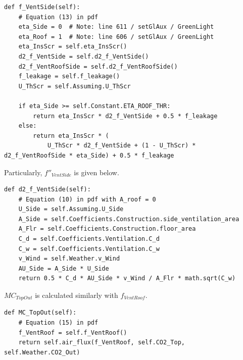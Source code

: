 \documentclass[a4paper]{article}
\begin{document}
\begin{mdframed}[leftline=false,rightline=false,backgroundcolor=magenta!10]
  \begin{verbatim}
def f_VentSide(self):
    # Equation (13) in pdf
    eta_Side = 0  # Note: line 611 / setGlAux / GreenLight
    eta_Roof = 1  # Note: line 606 / setGlAux / GreenLight
    eta_InsScr = self.eta_InsScr()
    d2_f_VentSide = self.d2_f_VentSide()
    d2_f_VentRoofSide = self.d2_f_VentRoofSide()
    f_leakage = self.f_leakage()
    U_ThScr = self.Assuming.U_ThScr

    if eta_Side >= self.Constant.ETA_ROOF_THR:
        return eta_InsScr * d2_f_VentSide + 0.5 * f_leakage
    else:
        return eta_InsScr * (
            U_ThScr * d2_f_VentSide + (1 - U_ThScr) * d2_f_VentRoofSide * eta_Side) + 0.5 * f_leakage
  \end{verbatim}
\end{mdframed}

Particularly, \(f''_{VentSide}\) is given below.
\begin{mdframed}[leftline=false,rightline=false,backgroundcolor=magenta!10]
  \begin{verbatim}
def d2_f_VentSide(self):
    # Equation (10) in pdf with A_roof = 0
    U_Side = self.Assuming.U_Side
    A_Side = self.Coefficients.Construction.side_ventilation_area
    A_Flr = self.Coefficients.Construction.floor_area
    C_d = self.Coefficients.Ventilation.C_d
    C_w = self.Coefficients.Ventilation.C_w
    v_Wind = self.Weather.v_Wind
    AU_Side = A_Side * U_Side
    return 0.5 * C_d * AU_Side * v_Wind / A_Flr * math.sqrt(C_w)
  \end{verbatim}
\end{mdframed}

\(MC_{TopOut}\) is calculated similarly with \(f_{VentRoof}\).
\begin{mdframed}[leftline=false,rightline=false,backgroundcolor=magenta!10]
  \begin{verbatim}
def MC_TopOut(self):
    # Equation (15) in pdf
    f_VentRoof = self.f_VentRoof()
    return self.air_flux(f_VentRoof, self.CO2_Top, self.Weather.CO2_Out)
  \end{verbatim}
\end{mdframed}
\end{document}

